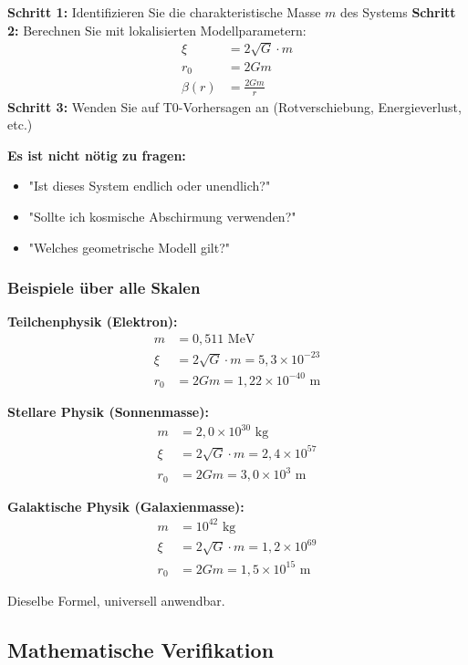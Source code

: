 \documentclass[12pt,a4paper]{article}
\begin{document}
\textbf{Schritt 1:} Identifizieren Sie die charakteristische Masse $m$ des Systems
\textbf{Schritt 2:} Berechnen Sie mit lokalisierten Modellparametern:
\begin{align}
	\xi &= 2\sqrt{G} \cdot m \\
	r_0 &= 2Gm \\
	\beta(r) &= \frac{2Gm}{r}
\end{align}
\textbf{Schritt 3:} Wenden Sie auf T0-Vorhersagen an (Rotverschiebung, Energieverlust, etc.)

\textbf{Es ist nicht nötig zu fragen:}
\begin{itemize}
	\item "Ist dieses System endlich oder unendlich?"
	\item "Sollte ich kosmische Abschirmung verwenden?"
	\item "Welches geometrische Modell gilt?"
\end{itemize}

\subsubsection{Beispiele über alle Skalen}
\label{subsubsec:examples_all_scales}

\textbf{Teilchenphysik (Elektron):}
\begin{align}
	m &= 0,511 \text{ MeV} \\
	\xi &= 2\sqrt{G} \cdot m = 5,3 \times 10^{-23} \\
	r_0 &= 2Gm = 1,22 \times 10^{-40} \text{ m}
\end{align}

\textbf{Stellare Physik (Sonnenmasse):}
\begin{align}
	m &= 2,0 \times 10^{30} \text{ kg} \\
	\xi &= 2\sqrt{G} \cdot m = 2,4 \times 10^{57} \\
	r_0 &= 2Gm = 3,0 \times 10^{3} \text{ m}
\end{align}

\textbf{Galaktische Physik (Galaxienmasse):}
\begin{align}
	m &= 10^{42} \text{ kg} \\
	\xi &= 2\sqrt{G} \cdot m = 1,2 \times 10^{69} \\
	r_0 &= 2Gm = 1,5 \times 10^{15} \text{ m}
\end{align}

Dieselbe Formel, universell anwendbar.

\subsection{Mathematische Verifikation}
\label{subsec:mathematical_verification}
\end{document}
